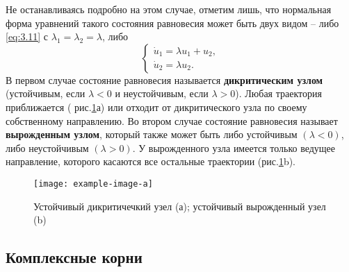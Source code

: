  Не останавливаясь подробно на этом случае, отметим лишь, что нормальная форма уравнений такого состояния равновесия может быть двух видом -- либо \eqref{eq:3.11} с $\lambda_1=\lambda_2=\lambda$, либо 
 \begin{equation}
         \label{eq:3.24}
         \begin{cases}
                 \dot u_1 = \lambda u_1 + u_2, \\
                 \dot u_2= \lambda u_2.
         \end{cases}
 \end{equation}
 В первом случае состояние равновесия называется \textbf{ дикритическим узлом} 
 (устойчивым, если $\lambda<0$ и неустойчивым, если $\lambda>0$). Любая траектория приближается ( рис.\ref{fig:3.6}а) или отходит от дикритического узла по своему собственному направлению. Во втором случае состояние равновесия  
 называет \textbf{ вырожденным узлом}, который также может быть либо устойчивым $(\lambda<0)$, либо неустойчивым $(\lambda>0)$. У вырожденного узла имеется только ведущее направление, которого касаются все остальные траектории (рис.\ref{fig:3.6}b).

 \begin{figure}[h!]
         \centering
         \texttt{[image: example-image-a]}
         \label{fig:3.6}
         \caption{Устойчивый дикритичечкий узел (а); устойчивый вырожденный узел (b)}
 \end{figure}
 
\subsection{Комплексные корни}%
\label{sub:3.2.2}

